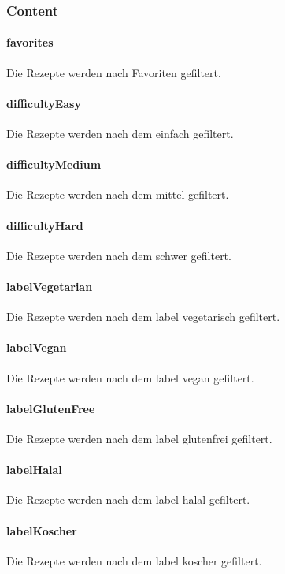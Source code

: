 \documentclass[parskip=full]{scrartcl}
\begin{document}
        \subsubsection*{Content}
            \paragraph*{favorites} Die Rezepte werden nach Favoriten gefiltert.
            \paragraph*{difficultyEasy} Die Rezepte werden nach dem  einfach gefiltert.
            \paragraph*{difficultyMedium} Die Rezepte werden nach dem  mittel gefiltert.
            \paragraph*{difficultyHard} Die Rezepte werden nach dem  schwer gefiltert.
            \paragraph*{labelVegetarian} Die Rezepte werden nach dem \gls{label} vegetarisch gefiltert.
            \paragraph*{labelVegan} Die Rezepte werden nach dem \gls{label} vegan gefiltert.
            \paragraph*{labelGlutenFree} Die Rezepte werden nach dem \gls{label} glutenfrei gefiltert.
            \paragraph*{labelHalal} Die Rezepte werden nach dem \gls{label} halal gefiltert.
            \paragraph*{labelKoscher} Die Rezepte werden nach dem \gls{label} koscher gefiltert.
\end{document}
